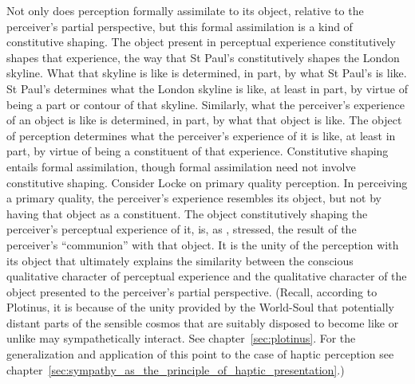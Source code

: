 Not only does perception formally assimilate to its object, relative to the perceiver's partial perspective, but this formal assimilation is a kind of constitutive shaping. The object present in perceptual experience constitutively shapes that experience, the way that St Paul's constitutively shapes the London skyline. What that skyline is like is determined, in part, by what St Paul's is like. St Paul's determines what the London skyline is like, at least in part, by virtue of being a part or contour of that skyline. Similarly, what the perceiver's experience of an object is like is determined, in part, by what that object is like. The object of perception determines what the perceiver's experience of it is like, at least in part, by virtue of being a constituent of that experience. Constitutive shaping entails formal assimilation, though formal assimilation need not involve constitutive shaping. Consider Locke on primary quality perception. In perceiving a primary quality, the perceiver's experience resembles its object, but not by having that object as a constituent. The object constitutively shaping the perceiver's perceptual experience of it, is, as \citet{Ardley:1958aa}, stressed, the result of the perceiver's ``communion'' with that object. It is the unity of the perception with its object that ultimately explains the similarity between the conscious qualitative character of perceptual experience and the qualitative character of the object presented to the perceiver's partial perspective. (Recall, according to Plotinus, it is because of the unity provided by the World-Soul that potentially distant parts of the sensible cosmos that are suitably disposed to become like or unlike may sympathetically interact. See chapter~\ref{sec:plotinus}. For the generalization and application of this point to the case of haptic perception see chapter~\ref{sec:sympathy_as_the_principle_of_haptic_presentation}.)

